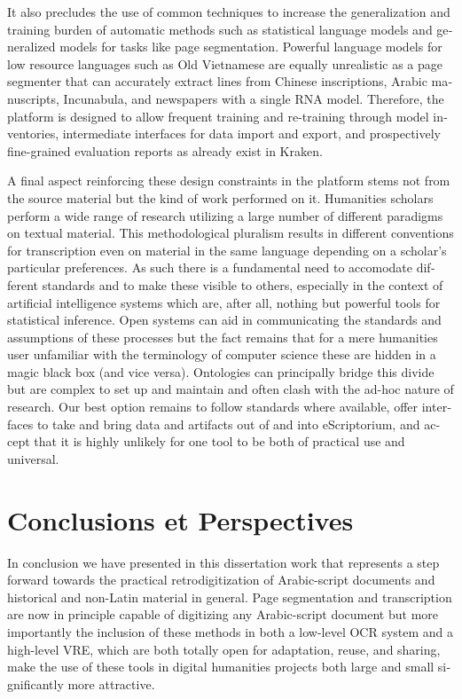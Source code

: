 \begin{french}
It also precludes the use of common techniques to increase the generalization
and training burden of automatic methods such as statistical language models
and generalized models for tasks like page segmentation. Powerful language
models for low resource languages such as Old Vietnamese are equally
unrealistic as a page segmenter that can accurately extract lines from Chinese
inscriptions, Arabic manuscripts, Incunabula, and newspapers with a single RNA
model. Therefore, the platform is designed to allow frequent training and
re-training through model inventories, intermediate interfaces for data import
and export, and prospectively fine-grained evaluation reports as already exist
in Kraken.

A final aspect reinforcing these design constraints in the platform stems not
from the source material but the kind of work performed on it. Humanities
scholars perform a wide range of research utilizing a large number of different
paradigms on textual material. This methodological pluralism results in
different conventions for transcription even on material in the same language
depending on a scholar's particular preferences. As such there is a fundamental
need to accomodate different standards and to make these visible to others,
especially in the context of artificial intelligence systems which are, after
all, nothing but powerful tools for statistical inference. Open systems can aid
in communicating the standards and assumptions of these processes but the fact
remains that for a mere humanities user unfamiliar with the terminology of
computer science these are hidden in a magic black box (and vice versa).
Ontologies can principally bridge this divide but are complex to set up and
maintain and often clash with the ad-hoc nature of research. Our best option
remains to follow standards where available, offer interfaces to take and bring
data and artifacts out of and into eScriptorium, and accept that it is highly
unlikely for one tool to be both of practical use and universal.

\section{Conclusions et Perspectives}

In conclusion we have presented in this dissertation work that represents a
step forward towards the practical retrodigitization of Arabic-script documents
and historical and non-Latin material in general. Page segmentation and
transcription are now in principle capable of digitizing any Arabic-script
document but more importantly the inclusion of these methods in both a
low-level OCR system and a high-level VRE, which are both totally open for
adaptation, reuse, and sharing, make the use of these tools in digital
humanities projects both large and small significantly more attractive.


\end{french}
